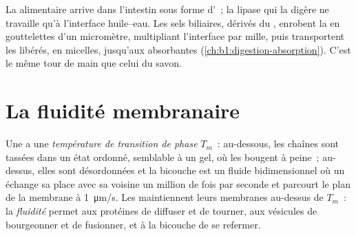 \begin{example}\label{ex:b1:lipids:bile}
La  alimentaire arrive dans l'intestin sous forme d'~; la
lipase qui la digère ne travaille qu'à l'interface huile--eau. Les sels
biliaires, dérivés  du , enrobent la  en
gouttelettes d'un micromètre, multipliant l'interface par mille, puis
transportent les  libérés, en micelles, jusqu'aux 
absorbantes (\cref{ch:b1:digestion-absorption}). C'est le même tour de
main que celui du savon.
\end{example}

\section{La fluidité membranaire}

\begin{definition}\label{def:b1:lipids:fluidity}
Une  a une \emph{température de transition de
phase} $T_m$~: au-dessous,
les chaînes sont tassées dans un état ordonné, semblable à un gel, où
les  bougent à peine~; au-dessus, elles sont désordonnées et la
bicouche est un fluide bidimensionnel où un  échange sa place avec
sa voisine un million de fois par seconde et parcourt le plan de la
membrane à \qty{1}{\micro m/s}. Les  maintiennent leurs
membranes au-dessus de $T_m$~: la \emph{fluidité}
 permet aux protéines de diffuser et de
tourner, aux
vésicules de bourgeonner et de fusionner, et à la bicouche de se
refermer.
\end{definition}

